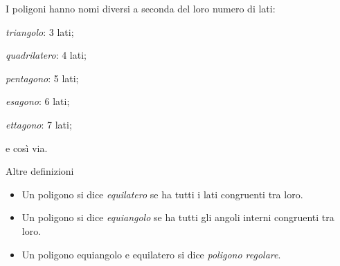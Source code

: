 
I poligoni hanno nomi diversi a seconda del loro numero di lati:
\begin{multicols}{3}
\begin{itemize*}
\item \emph{triangolo}: 3 lati;
\item \emph{quadrilatero}: 4 lati;
\item \emph{pentagono}: 5 lati;
\item \emph{esagono}: 6 lati;
\item \emph{ettagono}: 7 lati;
\item e così via.
\end{itemize*}
\end{multicols}


\begin{definizione}
Altre definizioni
\begin{itemize} [nosep]
\item Un poligono si dice \emph{equilatero} se ha tutti i lati congruenti 
tra loro.
\item Un poligono si dice \emph{equiangolo} se ha tutti gli angoli interni 
congruenti tra loro.
\item Un poligono equiangolo e equilatero si dice \emph{poligono regolare}.
\end{itemize}
\end{definizione}





